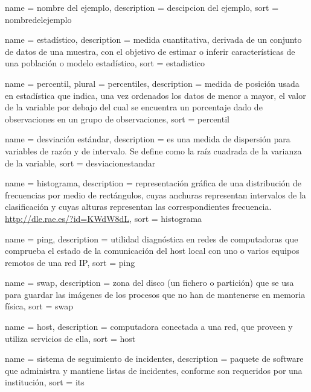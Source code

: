 \newpage
 {
  name = {nombre del ejemplo},
  description = {descipcion del ejemplo},
  sort = {nombredelejemplo}
}

 {
  name        = {estadístico},
  description =
    {medida cuantitativa, derivada de un conjunto de datos de una muestra, con
    el objetivo de estimar o inferir características de una población o modelo
    estadístico},
  sort        = {estadistico}
}

 {
  name        = {percentil},
  plural      = {percentiles},
  description =
    {medida de posición usada en estadística que indica, una vez ordenados los
    datos de menor a mayor, el valor de la variable por debajo del cual se
    encuentra un porcentaje dado de observaciones en un grupo de observaciones},
  sort        = {percentil}
}

 {
  name        = {desviación estándar},
  description =
    {es una medida de dispersión para variables de razón y de intervalo. Se
    define como la raíz cuadrada de la varianza de la variable},
  sort        = {desviacionestandar}
}

 {
  name        = {histograma},
  description =
    {representación gráfica de una distribución de frecuencias por medio de
    rectángulos, cuyas anchuras representan intervalos de la clasificación y
    cuyas alturas representan las correspondientes frecuencia.
    \url{http://dle.rae.es/?id=KWdW8dL}},
  sort        = {histograma}
}

 {
  name        = {ping},
  description =
    {utilidad diagnóstica en redes de computadoras que comprueba el estado de
    la comunicación del host local con uno o varios equipos remotos de una red
    IP},
  sort        = {ping}
}

 {
  name        = {swap},
  description =
    {zona del disco (un fichero o partición) que se usa para guardar las
    imágenes de los procesos que no han de mantenerse en memoria física},
  sort        = {swap}
}

 {
  name        = {host},
  description =
    {computadora conectada a una red, que proveen y utiliza servicios de ella},
  sort        = {host}
}

 {
  name        = {sistema de seguimiento de incidentes},
  description =
    {paquete de software que administra y mantiene listas de incidentes,
    conforme son requeridos por una institución},
  sort        = {its}
}

